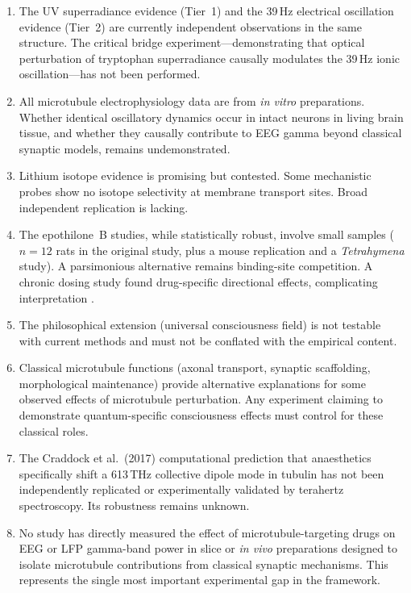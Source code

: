 \documentclass[10pt, a4paper, twocolumn]{article}
\begin{document}
\begin{enumerate}[label=(\arabic*)]

\item The UV superradiance evidence (Tier~1) and the 39\,Hz electrical
oscillation evidence (Tier~2) are currently independent observations in
the same structure. The critical bridge experiment---demonstrating that
optical perturbation of tryptophan superradiance causally modulates the
39\,Hz ionic oscillation---has not been performed.

\item All microtubule electrophysiology data are from \emph{in vitro}
preparations. Whether identical oscillatory dynamics occur in intact
neurons in living brain tissue, and whether they causally contribute to
EEG gamma beyond classical synaptic models, remains undemonstrated.

\item Lithium isotope evidence is promising but contested. Some
mechanistic probes show no isotope selectivity at membrane transport
sites. Broad independent replication is lacking.

\item The epothilone~B studies, while statistically robust, involve
small samples ($n=12$ rats in the original study, plus a mouse
replication and a \textit{Tetrahymena} study). A parsimonious
alternative remains binding-site competition. A chronic dosing study
found drug-specific directional effects, complicating interpretation
\cite{li2025chronic}.

\item The philosophical extension (universal consciousness field) is
not testable with current methods and must not be conflated with the
empirical content.

\item Classical microtubule functions (axonal transport, synaptic
scaffolding, morphological maintenance) provide alternative explanations
for some observed effects of microtubule perturbation. Any experiment
claiming to demonstrate quantum-specific consciousness effects must
control for these classical roles.

\item The Craddock et al.\ (2017) computational prediction that
anaesthetics specifically shift a 613\,THz collective dipole mode in
tubulin has not been independently replicated or experimentally
validated by terahertz spectroscopy. Its robustness remains unknown.

\item No study has directly measured the effect of
microtubule-targeting drugs on EEG or LFP gamma-band power in
slice or \emph{in vivo} preparations designed to isolate microtubule
contributions from classical synaptic mechanisms. This represents the
single most important experimental gap in the framework.


\end{enumerate}
\end{document}
